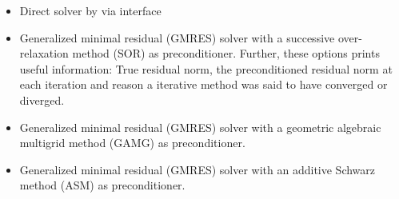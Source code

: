 \documentclass[letterpaper,10pt,english]{sphinxmanual}
\begin{document}
\begin{itemize}
\item {} 
Direct solver by  via  interface

\begin{sphinxVerbatim}[commandchars=\\\{\}]
 
 
\end{sphinxVerbatim}

\item {} 
Generalized minimal residual (GMRES) solver with a successive over-relaxation method (SOR) as preconditioner. Further, these options prints useful information: True residual norm, the preconditioned residual norm at each iteration and reason a iterative method was said to have converged or diverged.

\begin{sphinxVerbatim}[commandchars=\\\{\}]
 
 
 
\end{sphinxVerbatim}

\item {} 
Generalized minimal residual (GMRES) solver with a geometric algebraic multigrid method (GAMG) as preconditioner.

\begin{sphinxVerbatim}[commandchars=\\\{\}]
 
 
 
\end{sphinxVerbatim}

\item {} 
Generalized minimal residual (GMRES) solver with an additive Schwarz method (ASM) as preconditioner.

\begin{sphinxVerbatim}[commandchars=\\\{\}]
 
 
 
 
\end{sphinxVerbatim}


\end{itemize}
\end{document}
